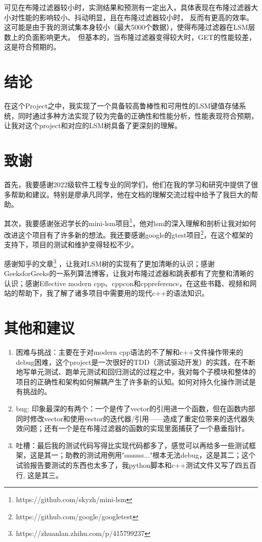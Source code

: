 \documentclass[UTF8]{article}
\begin{document}
可见在布隆过滤器较小时，实测结果和预测有一定出入，具体表现在布隆过滤器大小对性能的影响较小、抖动明显，且在布隆过滤器较小时，
反而有更高的效率。这可能是由于我的测试集本身较小（最大5000个数据），使得布隆过滤器在LSM层数上的负面影响更大。\
但基本的，当布隆过滤器变得较大时，GET的性能较差，这是符合预期的。
\section{结论}
在这个Project之中，我实现了一个具备较高鲁棒性和可用性的LSM键值存储系统，同时通过多种方法实现了较为完备的正确性和性能分析，性能表现符合预期，让我对这个project和对应的LSM树具备了更深刻的理解。

\section{致谢}
首先，我要感谢2022级软件工程专业的同学们，他们在我的学习和研究中提供了很多帮助和建议。特别是廖承凡同学，他在文档的理解交流过程中给予了我巨大的帮助。

其次，我要感谢张迟学长的mini-lsm项目\footnote{https://github.com/skyzh/mini-lsm}，他对lsm的深入理解和剖析让我对如何改进这个项目有了许多新的想法。我还要感谢google的gtest项目\footnote{https://github.com/google/googletest}，在这个框架的支持下，项目的测试和维护变得轻松不少。

感谢知乎的文章\footnote{https://zhuanlan.zhihu.com/p/415799237} ，让我对LSM树的实现有了更加清晰的认识；感谢GeeksforGeeks的一系列算法博客，让我对布隆过滤器和跳表都有了完整和清晰的认识；感谢Effective modern cpp、cppcon和cppreference，在这些书籍、视频和网站的帮助下，我了解了诸多项目中需要用的现代c++的语法知识。

\section{其他和建议}
\begin{enumerate}
    \item 困难与挑战：主要在于对modern cpp语法的不了解和c++文件操作带来的debug困难，这个project是一次很好的TDD（测试驱动开发）的实践，在不断地写单元测试、跑单元测试和回归测试的过程之中，我对每个子模块和整体的项目的正确性和架构如何解耦产生了许多新的认知。如何对持久化操作测试是有挑战的。
    \item bug: 印象最深的有两个：一个是传了vector的引用进一个函数，但在函数内部同时修改vector和使用vector的迭代器/引用——造成了重定位带来的迭代器失效问题；还有一个是在布隆过滤器的函数的实现里面捕获了一个悬垂指针。
    \item 吐槽：最后我的测试代码写得比实现代码都多了，感觉可以再给多一些测试框架，这是其一；助教的测试用例用"sssssss..."根本无法debug，这是其二；这个试验报告要测试的东西也太多了，我python脚本和c++测试文件又写了四五百行, 这是其三。
\end{enumerate}
\end{document}
